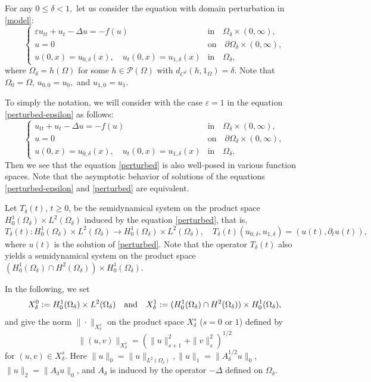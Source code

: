 \documentclass[11pt]{amsart}
\begin{document}
For any $0\leq \delta <1,$ let us consider the equation with domain perturbation in \eqref{model}:
\begin{equation} \label{perturbed-epsilon}
\begin{cases}
\varepsilon u_{tt} + u_t - \Delta u = -f(u)  ~& \mbox{in}\quad \Omega_\delta \times (0,\infty), \\
u=0 &\mbox{on} \quad \partial \Omega_\delta \times (0, \infty), \\
u(0,x) = u_{0,\delta}(x), \quad u_t(0,x)=u_{1,\delta}(x) & \mbox{in}  \quad \Omega_\delta,
\end{cases}
\end{equation}
where  $\Omega_{\delta} = h (\Omega)$ for some $h \in \mathcal P (\Omega)$ with $d_{C^2}(h,1_\Omega)=\delta$. Note that $\Omega_0 =\Omega$, $u_{0,0}=u_0,$ and $u_{1,0}=u_1$.


To simply the notation, we will consider with the case $\varepsilon = 1$ in the equation \eqref{perturbed-epsilon} as follows:
\begin{equation} \label{perturbed}
\begin{cases}
u_{tt} + u_t - \Delta u = -f(u)  ~& \mbox{in}\quad \Omega_\delta \times (0,\infty), \\
u=0 &\mbox{on} \quad \partial \Omega_\delta \times (0, \infty), \\
u(0,x) = u_{0,\delta}(x), \quad u_t(0,x)=u_{1,\delta}(x) & \mbox{in}  \quad \Omega_\delta, 
\end{cases}
\end{equation}
 Then we see that  the equation \eqref{perturbed} is also well-posed in various function spaces. Note that the asymptotic behavior of solutions of the equations \eqref{perturbed-epsilon} and \eqref{perturbed} are equivalent.



Let  $T_\delta (t)$, $t \geq0$, be the semidynamical system on the product space $H_0^1(\Omega_{\delta}) \times L^2(\Omega_{\delta})$   induced by the equation \eqref{perturbed}, that is,  
$$T_\delta (t): H_0^1(\Omega_{\delta}) \times L^2(\Omega_{\delta}) \to H_0^1(\Omega_{\delta}) \times L^2(\Omega_{\delta}), \quad T_\delta (t) ( u_{0,\delta}, u_{1,\delta})= (u(t), \partial_t u(t)),$$
where $ u(t)$ is the solution of  \eqref{perturbed}. Note that the operator $T_\delta (t)$ also yields a semidynamical system on the product space $(H^1_0(\Omega_\delta) \cap H^2(\Omega_\delta))\times H^1_0(\Omega_\delta)$.


In the following, we set
$$X^0_\delta :=H_0^1(\Omega_{\delta}) \times L^2(\Omega_{\delta}) \quad {\rm and} \quad
       X^1_\delta := (H^1_0(\Omega_\delta) \cap H^2(\Omega_\delta))\times H^1_0(\Omega_\delta),$$
and give the norm $\| \cdot \|_{X^s_{\delta}}$ on the product space $ X^s_{\delta}$ ($s=0$ or $1$) defined by
$$\|(u,v)\|_{X^s_{\delta}} = \left(\|u\|^2_{s+1} +\|v\|^2_s\right)^{1/2}$$
for $(u,v)\in X^s_{\delta}$. Here $\|u\|_0 = \|u\|_{L^2(\Omega_\delta)}, \|u\|_1 = \|A_\delta^{1/2}u\|_0$, $\|u\|_2 = \|A_\delta u\|_0$, and $A_\delta$ is  induced by the operator $-\Delta$ defined on $\Omega_\delta$.
\end{document}
